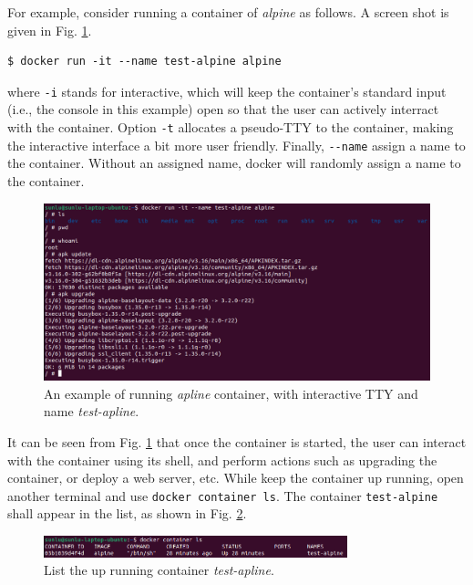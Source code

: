 For example, consider running a container of \textit{alpine} as follows. A screen shot is given in Fig. \ref{ch:vac:fig:dockerrunexp}.
\begin{lstlisting}
$ docker run -it --name test-alpine alpine
\end{lstlisting}
where \verb|-i| stands for interactive, which will keep the container's standard input (i.e., the console in this example) open so that the user can actively interract with the container. Option \verb|-t| allocates a pseudo-TTY to the container, making the interactive interface a bit more user friendly. Finally, \verb|--name| assign a name to the container. Without an assigned name, docker will randomly assign a name to the container.
\begin{figure}
	\centering
	\includegraphics[width=350pt]{chapters/ch_virtualization_and_containerization/figures/dockerrunexp.png}
	\caption{An example of running \textit{apline} container, with interactive TTY and name \textit{test-apline}.} \label{ch:vac:fig:dockerrunexp}
\end{figure}

It can be seen from Fig. \ref{ch:vac:fig:dockerrunexp} that once the container is started, the user can interact with the container using its shell, and perform actions such as upgrading the container, or deploy a web server, etc. While keep the container up running, open another terminal and use \verb|docker container ls|. The container \verb|test-alpine| shall appear in the list, as shown in Fig. \ref{ch:vac:fig:dockerrunexppart2}.
\begin{figure}
	\centering
	\includegraphics[width=250pt]{chapters/ch_virtualization_and_containerization/figures/dockerrunexppart2.png}
	\caption{List the up running container \textit{test-apline}.} \label{ch:vac:fig:dockerrunexppart2}
\end{figure}

